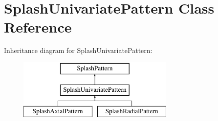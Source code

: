 \hypertarget{class_splash_univariate_pattern}{}\section{Splash\+Univariate\+Pattern Class Reference}
\label{class_splash_univariate_pattern}
Inheritance diagram for Splash\+Univariate\+Pattern\+:\begin{figure}[H]
\begin{center}
\leavevmode
\includegraphics[height=3.000000cm]{class_splash_univariate_pattern}
\end{center}
\end{figure}
